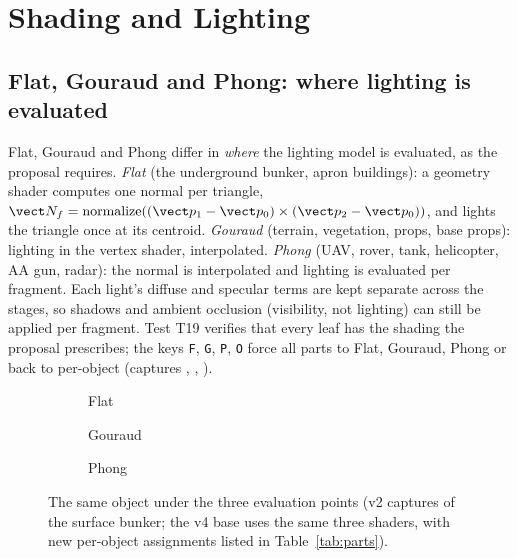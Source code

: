 \section{Shading and Lighting}\label{sec:shading}
\subsection{Flat, Gouraud and Phong: where lighting is evaluated}
Flat, Gouraud and Phong differ in \emph{where} the lighting model is evaluated, as the proposal requires.
\emph{Flat} (the underground bunker, apron buildings): a geometry shader computes one normal per triangle,
$\vect N_f=\mathrm{normalize}((\vect p_1-\vect p_0)\times(\vect p_2-\vect p_0))$, and lights the triangle once at its
centroid. \emph{Gouraud} (terrain, vegetation, props, base props): lighting in the vertex shader, interpolated.
\emph{Phong} (UAV, rover, tank, helicopter, AA gun, radar): the normal is interpolated and lighting is evaluated per
fragment. Each light's diffuse and specular terms are kept separate across the stages, so shadows and ambient occlusion
(visibility, not lighting) can still be applied per fragment. Test T19 verifies that every leaf has the shading the
proposal prescribes; the keys \texttt{F}, \texttt{G}, \texttt{P}, \texttt{O} force all parts to Flat, Gouraud, Phong or
back to per-object (captures , , ).

\begin{figure}[h]
  \centering
  \begin{subfigure}{0.325\linewidth}\caption{Flat}\end{subfigure}
  \begin{subfigure}{0.325\linewidth}\caption{Gouraud}\end{subfigure}
  \begin{subfigure}{0.325\linewidth}\caption{Phong}\end{subfigure}
  \caption{The same object under the three evaluation points (v2 captures of the surface bunker; the v4 base
  uses the same three shaders, with new per-object assignments listed in Table~\ref{tab:parts}).}
  \label{fig:shading}
\end{figure}

